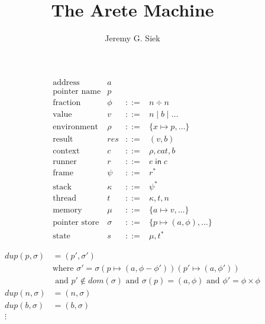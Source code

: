 \documentclass{article}
\title{The Arete Machine}
\author{Jeremy G. Siek}
\newcommand{\IN}{\mathop{\mathsf{in}}}
\begin{document}
\maketitle

\[
\begin{array}{lrcl}
  \text{address} & a \\
  \text{pointer name} & p \\
  \text{fraction} & \phi & ::= & n \div n \\
  \text{value}& v & ::= & n \mid b \mid \ldots \\
  \text{environment} & \rho & ::= & \{ x \mapsto p, \ldots \} \\
  \text{result} & \mathit{res} & ::= & (v , b) \\
  \text{context} & c & ::= & \rho, \mathit{cat}, b \\
  \text{runner}& r & ::= & e \IN c\\
  \text{frame}& \psi & ::= & r^{*} \\
  \text{stack}& \kappa & ::= & \psi^{*} \\
  \text{thread}& t & ::= & \kappa, t, n \\
  \text{memory}& \mu & ::= & \{ a \mapsto v, \ldots \} \\
  \text{pointer store} & \sigma & ::= & \{ p \mapsto (a, \phi), \ldots \} \\
  \text{state}& s & ::= & \mu, t^{*}
\end{array}
\]

\begin{align*}
  \mathit{dup}(p,\sigma) &= (p', \sigma') \\
  & \text{where } \sigma' = \sigma(p \mapsto (a,\phi - \phi'))(p'\mapsto (a,\phi')) \\
    & \text{ and } p' \notin \mathit{dom}(\sigma) \text{ and }
         \sigma(p) = (a,\phi) \text{ and } \phi' = \phi \times \phi \\
  \mathit{dup}(n,\sigma) &= (n,\sigma) \\
  \mathit{dup}(b,\sigma) &= (b,\sigma) \\
   \vdots
\end{align*}
\end{document}
